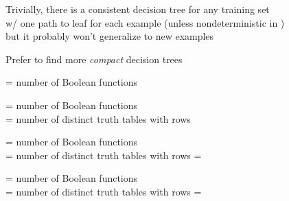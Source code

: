\documentclass{article}
\begin{document}
\begin{huge}
\vspace*{0.2in}

\textwidth
{}

Trivially, there is a consistent decision tree for any training set\\
w/ one path to leaf for each example (unless  nondeterministic in )\\
but it probably won't generalize to new examples

Prefer to find more \emph{compact} decision trees







= number of Boolean functions



= number of Boolean functions\\
= number of distinct truth tables with  rows



= number of Boolean functions\\
= number of distinct truth tables with  rows = 



= number of Boolean functions\\
= number of distinct truth tables with  rows = 


\end{huge}
\end{document}
